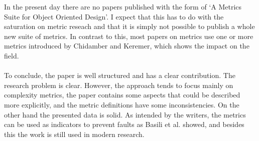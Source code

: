 In the present day there are no papers published with the form of `A Metrics Suite for Object Oriented Design'. I expect that this has
to do with the saturation on metric reseach and that it is simply not possible to publish a whole new suite of metrics.
In contrast to this, most papers on metrics use one or more metrics introduced by Chidamber and Keremer, which shows the
impact on the field.

\paragraph{}
To conclude, the paper is well structured and has a clear contribution. The research problem is clear. However, the
approach tends to focus mainly on complexity metrics, the paper contains some aspects that could be described more explicitly,
and the metric definitions have some inconsistencies. On the other hand the presented data is solid.
As intended by the writers, the metrics can be used as indicators to prevent faults as Basili et al. \autocite{BASILI} showed, and
besides this the work is still used in modern research.
